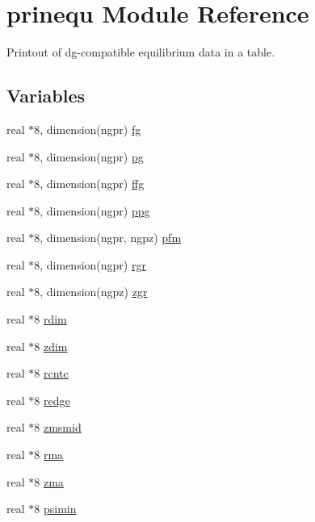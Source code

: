 \hypertarget{namespaceprinequ}{
\section{prinequ Module Reference}
\label{namespaceprinequ}
}
Printout of dg-compatible equilibrium data in a table.  


\subsection*{Variables}
\begin{CompactItemize}
\item 
real $\ast$8, dimension(ngpr) \hyperlink{namespaceprinequ_8c941e8d1710a7e26be0b09de01cc307}{fg}
\item 
real $\ast$8, dimension(ngpr) \hyperlink{namespaceprinequ_27c808b12ae848c864b2ff5c5369e351}{pg}
\item 
real $\ast$8, dimension(ngpr) \hyperlink{namespaceprinequ_f8556fceda08dd098e7ba4d9057fd31c}{ffg}
\item 
real $\ast$8, dimension(ngpr) \hyperlink{namespaceprinequ_d9209d25e3945dd8a3d16e06dd159380}{ppg}
\item 
real $\ast$8, dimension(ngpr, ngpz) \hyperlink{namespaceprinequ_bfe2ebab5c6892d669d60769f6271de2}{pfm}
\item 
real $\ast$8, dimension(ngpr) \hyperlink{namespaceprinequ_138b25820f0b9623a1ad87f0e82f7d8d}{rgr}
\item 
real $\ast$8, dimension(ngpz) \hyperlink{namespaceprinequ_fa746dd8a2614f015972663b4d587fd2}{zgr}
\item 
real $\ast$8 \hyperlink{namespaceprinequ_abf70da38478de9db7c738b09c099027}{rdim}
\item 
real $\ast$8 \hyperlink{namespaceprinequ_3a44d82c8ebf602b6048ebf656101a4b}{zdim}
\item 
real $\ast$8 \hyperlink{namespaceprinequ_83e3bb5db3b95a0d14bd1261dbc323ab}{rcntc}
\item 
real $\ast$8 \hyperlink{namespaceprinequ_daccbb92c2237bfd27acd42cfc7a1753}{redge}
\item 
real $\ast$8 \hyperlink{namespaceprinequ_60a29e973631324ed2ad950585ad50d4}{zmsmid}
\item 
real $\ast$8 \hyperlink{namespaceprinequ_9baaf20a81d9b0570388ae03719ea32e}{rma}
\item 
real $\ast$8 \hyperlink{namespaceprinequ_2eef48f5c40af1c24381aed32f643c19}{zma}
\item 
real $\ast$8 \hyperlink{namespaceprinequ_5c8e4bf1504c7b93d7ff84932c976a15}{psimin}

\end{CompactItemize}
